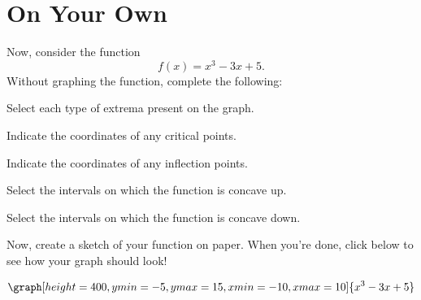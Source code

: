 \documentclass{ximera}
\begin{document}
\section{On Your Own}
\begin{question}
Now, consider the function $$f(x)=x^3-3x+5\text{.}$$ Without graphing the function, complete the following:

Select each type of extrema present on the graph.
\begin{selectAll}
\end{selectAll}

Indicate the coordinates of any critical points.
\begin{selectAll}
\end{selectAll}

Indicate the coordinates of any inflection points.
\begin{selectAll}
\end{selectAll}

Select the intervals on which the function is concave up.
\begin{selectAll}
\choice{$[-5,10]$}
\choice{$[1,2]$}
\choice[correct]{$[0,\infty)$}
\choice{$(-\infty, 0]$}
\end{selectAll}

Select the intervals on which the function is concave down.

\begin{selectAll}
\choice{$[0,10]$}
\choice{$[1,2]$}
\choice{$[0,\infty)$}
\choice[correct]{$(-\infty,0]$}
\end{selectAll}

Now, create a sketch of your function on paper. When you're done, click below to see how your graph should look!

\begin{multipleChoice}
\end{multipleChoice}
\begin{feedback}[correct]
\[
\graph[height=400,ymin=-5,ymax=15,xmin=-10,xmax=10]{x^3-3x+5}
\]
\end{feedback}
\end{question}
\end{document}
